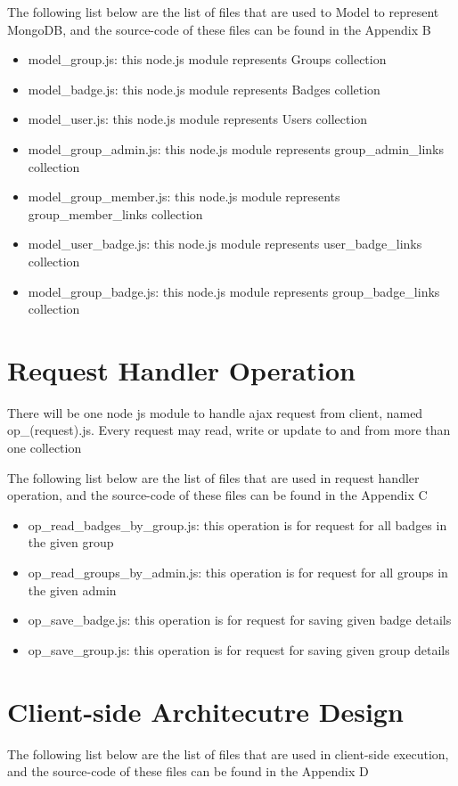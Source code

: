 The following list below are the list of files that are used to Model to represent MongoDB, and the source-code of these files can be found in the Appendix B

\begin{itemize}
\item model{\_}group.js: this node.js module represents Groups collection
\item model{\_}badge.js: this node.js module represents Badges colletion
\item model{\_}user.js: this node.js module represents Users collection
\item model{\_}group{\_}admin.js: this node.js module represents group{\_}admin{\_}links collection
\item model{\_}group{\_}member.js: this node.js module represents group{\_}member{\_}links collection
\item model{\_}user{\_}badge.js: this node.js module represents user{\_}badge{\_}links collection
\item model{\_}group{\_}badge.js: this node.js module represents group{\_}badge{\_}links collection
\end{itemize}

\section{Request Handler Operation}
There will be one node js module to handle ajax request from client, named op{\_}(request).js. Every request may read, write or update to and from more than one collection


The following list below are the list of files that are used in request handler operation, and the source-code of these files can be found in the Appendix C

\begin{itemize}
\item op{\_}read{\_}badges{\_}by{\_}group.js: this operation is for request for all badges in the given group
\item op{\_}read{\_}groups{\_}by{\_}admin.js: this operation is for request for all groups in the given admin
\item op{\_}save{\_}badge.js: this operation is for request for saving given badge details
\item op{\_}save{\_}group.js: this operation is for request for saving given group details
\end{itemize}

\section{Client-side Architecutre Design}
The following list below are the list of files that are used in client-side execution, and the source-code of these files can be found in the Appendix D

